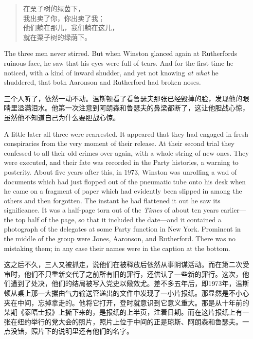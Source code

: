 \begin{paracol}{2}
\begin{quotation}
\noindent 在栗子树的绿茵下，\\
我出卖了你，你出卖了我；\\
他们躺在那儿，我们躺在这儿，\\
就在栗子树的绿荫下。
\end{quotation}

\switchcolumn*

The three men never stirred. But when Winston glanced again at
Rutherford\textquotesingle s ruinous face, he saw that his eyes were
full of tears. And for the first time he noticed, with a kind of inward
shudder, and yet not knowing \emph{at what} he shuddered, that both
Aaronson and Rutherford had broken noses.

\switchcolumn

三个人听了，依然一动不动。温斯顿看了看鲁瑟夫那张已经毁掉的脸，发现他的眼睛里溢满泪水。他第一次注意到阿朗森和鲁瑟夫的鼻梁都断了，这让他胆战心惊，虽然他不知道自己为什么要胆战心惊。

\switchcolumn*

A little later all three were rearrested. It appeared that they had
engaged in fresh conspiracies from the very moment of their release. At
their second trial they confessed to all their old crimes over again,
with a whole string of new ones. They were executed, and their fate was
recorded in the Party histories, a warning to posterity. About five
years after this, in 1973, Winston was unrolling a wad of documents
which had just flopped out of the pneumatic tube onto his desk when he
came on a fragment of paper which had evidently been slipped in among
the others and then forgotten. The instant he had flattened it out he
saw its significance. It was a half-page torn out of the \emph{Times} of
about ten years earlier---the top half of the page, so that it included
the date---and it contained a photograph of the delegates at some Party
function in New York. Prominent in the middle of the group were Jones,
Aaronson, and Rutherford. There was no mistaking them; in any case their
names were in the caption at the bottom.

\switchcolumn

这之后不久，三人又被抓走，说他们在被释放后依然从事阴谋活动。而在第二次受审时，他们不只重新交代了之前所有旧的罪行，还供认了一些新的罪行。这次，他们遭到了处决，他们的结局被写入党史以儆效尤。差不多五年后，即1973年，温斯顿从桌上那一大摞由气力输送管递出的文件中发现了一小片报纸。那显然是不小心夹在中间，忘掉拿走的。他将它打开，登时就意识到它意义重大。那是从十年前的某期《泰晤士报》上撕下来的，是报纸的上半页，注着日期。而在这片报纸上有一张在纽约举行的党大会的照片，照片上位于中间的正是琼斯、阿朗森和鲁瑟夫。一点没错，照片下的说明里还有他们的名字。


\end{paracol}
